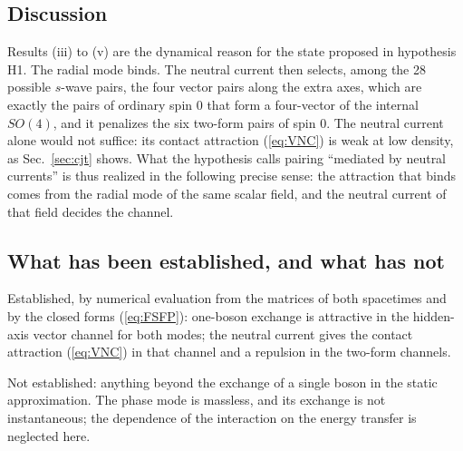 \subsection{Discussion}

Results (iii) to (v) are the dynamical reason for the state proposed in hypothesis H1. The radial mode
binds. The neutral current then selects, among the 28 possible $s$-wave pairs, the four vector pairs
along the extra axes, which are exactly the pairs of ordinary spin 0 that form a four-vector of the
internal $SO(4)$, and it penalizes the six two-form pairs of spin 0. The neutral current alone would
not suffice: its contact attraction (\ref{eq:VNC}) is weak at low density, as Sec.~\ref{sec:cjt}
shows. What the hypothesis calls pairing ``mediated by neutral currents'' is thus realized in the
following precise sense: the attraction that binds comes from the radial mode of the same scalar
field, and the neutral current of that field decides the channel.

\subsection{What has been established, and what has not}

Established, by numerical evaluation from the matrices of both spacetimes and by the closed forms
(\ref{eq:FSFP}): one-boson exchange is attractive in the hidden-axis vector channel for both modes;
the neutral current gives the contact attraction (\ref{eq:VNC}) in that channel and a repulsion in the
two-form channels.

Not established: anything beyond the exchange of a single boson in the static approximation. The
phase mode is massless, and its exchange is not instantaneous; the dependence of the interaction on
the energy transfer is neglected here.
